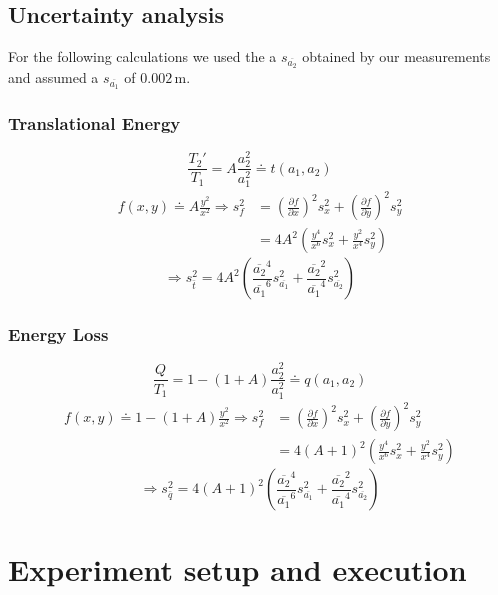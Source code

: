 \documentclass{scrreprt}
\newcommand{\unit}[1]{\ensuremath{\, \mathrm{#1}}}
\begin{document}
\subsection{Uncertainty analysis}

For the following calculations we used the a $s_{\overline{a_2}}$ obtained by our measurements and assumed a $s_{\overline{a_1}}$ of $0.002\unit{m}$.
\subsubsection{Translational Energy}
\begin{equation}
\frac{T_2'}{T_1}=A\frac{a_2^2}{a_1^2}\doteq t(a_1,a_2)
\end{equation}
\begin{align}
f(x,y) \doteq A\frac{y^2}{x^2} \Longrightarrow
s_f^2 &= \left(\frac{\partial f}{\partial x}\right)^2 s_x^2 + \left(\frac{\partial f}{\partial y}\right)^2 s_y^2\\
&= 4 A^2 \left( \frac{y^4}{x^6} s_x^2 + \frac{y^2}{x^4} s_y^2 \right)
\end{align}
\begin{equation}
\Longrightarrow s_{\bar{t}}^2 = 4 A^2 \left(\frac{\overline{a_2}^4}{\overline{a_1}^6} s_{\overline{a_1}}^2 + \frac{\overline{a_2}^2}{\overline{a_1}^4} s_{\overline{a_2}}^2 \right)
\end{equation}

\subsubsection{Energy Loss}
\begin{equation}
\frac{Q}{T_1}= 1-(1+A) \frac{a_2^2}{a_1^2} \doteq q(a_1,a_2)
\end{equation}
\begin{align}
f(x,y) \doteq 1-(1+A)\frac{y^2}{x^2} \Longrightarrow
s_f^2 &= \left(\frac{\partial f}{\partial x}\right)^2 s_x^2 + \left(\frac{\partial f}{\partial y}\right)^2 s_y^2\\
&= 4 (A+1)^2 \left( \frac{y^4}{x^6} s_x^2 + \frac{y^2}{x^4} s_y^2 \right)
\end{align}
\begin{equation}
\Longrightarrow s_{\bar{q}}^2 = 4 (A+1)^2 \left(\frac{\overline{a_2}^4}{\overline{a_1}^6} s_{\overline{a_1}}^2 + \frac{\overline{a_2}^2}{\overline{a_1}^4} s_{\overline{a_2}}^2 \right)
\end{equation}

\section{Experiment setup and execution}
\end{document}
